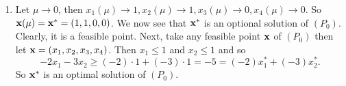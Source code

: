 \begin{enumerate}
\begin{enumerate}[label=(\alph*)]
\begin{enumerate}[label=(\arabic*)]
\begin{align*}
                                  \left[x_1 + \frac{\mu - 1}{2}\right]^2 & = \frac{\mu}{2} + \frac{(\mu - 1)^2}{4}                                \\
                                  x_1                                    & = - \frac{\mu - 1}{2} \pm \sqrt{\frac{\mu}{2} + \frac{(\mu - 1)^2}{4}}
                              \end{align*}
                              As \(x_1 \geq 0\), we have \\
                              \begin{minipage}[t]{0.45\textwidth}
                                  \[x_1 = - \frac{\mu - 1}{2} + \sqrt{\frac{\mu}{2} + \frac{(\mu - 1)^2}{4}}\]
                              \end{minipage}
                              \hfill
                              \begin{minipage}[t]{0.45\textwidth}
                                  \begin{align*}
                                      x_3 = 1 -x_1 & = 1 + \frac{\mu - 1}{2} - \sqrt{\frac{\mu}{2} + \frac{(\mu - 1)^2}{4}} \\
                                                   & = \frac{\mu + 1}{2} - \sqrt{\frac{\mu}{2} + \frac{(\mu - 1)^2}{4}}.
                                  \end{align*}
                              \end{minipage}
                        \item Similarly, as \(x_2 w_2 = \mu\) and \(w_2 = -3 - y_2\) we get
                              \[x_2 = - \frac{2\mu - 3}{6} + \sqrt{\frac{\mu}{3} + \frac{(2\mu - 3)^2}{36}} \text{ and } x_4 = 1 - x_2 = \frac{2\mu + 3}{6} - \sqrt{\frac{\mu}{3} + \frac{(2\mu - 3)^2}{36}}\]
                    \end{enumerate}
                    Thus \(\fx(\mu) = (x_1(\mu), x_2(\mu), x_3(\mu), x_4(\mu))\) as functions as above.
              \item Let \(\mu \to 0\), then \(x_1(\mu) \to 1, x_2(\mu) \to 1, x_3(\mu) \to 0, x_4(\mu) \to 0\). So \(\mathbf{x}(\mu) = \mathbf{x}^* = (1, 1, 0, 0)\). We now see that \(\mathbf{x}^*\) is an optional solution of \((P_0)\). Clearly, it is a feasible point. Next, take any feasible point \(\mathbf{x}\) of \((P_0)\) then let \(\mathbf{x} = (x_1, x_2, x_3, x_4)\). Then \(x_1 \leq 1\) and \(x_2 \leq 1\) and so \[-2x_1 - 3x_2 \geq (-2) \cdot 1 + (-3) \cdot 1 = -5 = (-2)x_1^* + (-3)x_2^*.\]
                    So \(\mathbf{x}^*\) is an optimal solution of \((P_0)\).

\end{enumerate}
\end{enumerate}
